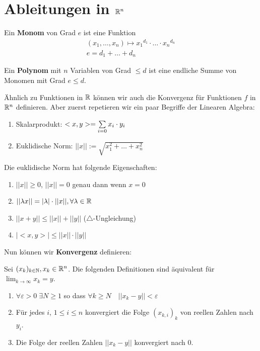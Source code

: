 \section{Ableitungen in $\mathbb{R}^n$}


Ein \textbf{Monom} von Grad $e$ ist eine Funktion
\begin{align*}
    (x_1, \dots, x_n) \mapsto {x_1}^{d_1} \cdot \ldots \cdot {x_n}^{d_n}\\
    e = d_1 + \ldots + d_n
\end{align*}

\begin{tcolorbox}
    Ein \textbf{Polynom} mit $n$ Variablen von Grad $\leq d$ ist eine endliche Summe von Monomen mit 
    Grad $e \leq d$.
\end{tcolorbox}



Ähnlich zu Funktionen in $\mathbb{R}$ können wir auch die Konvergenz für Funktionen $f$ in $\mathbb{R}^n$ definieren.
Aber zuerst repetieren wir ein paar Begriffe der Linearen Algebra:

\begin{enumerate}[label=(\arabic*)]
    \item Skalarprodukt: $<x,y> = \sum\limits_{i = 0} x_i \cdot y_i$
    \item Euklidische Norm: $||x|| := \sqrt{x_1^2 + \dots + x_n^2}$
\end{enumerate}

Die euklidische Norm hat folgende Eigenschaften:

\begin{enumerate}[label=(\arabic*)]
    \item $||x|| \geq 0$, $||x|| = 0$ genau dann wenn $x = 0$
    \item $||\lambda x|| = |\lambda| \cdot ||x||, \forall \lambda \in \mathbb{R}$
    \item $||x + y|| \leq ||x|| + ||y||$ ($\triangle$-Ungleichung)
    \item $|<x,y>| \leq ||x|| \cdot ||y||$
\end{enumerate}


\vfill\null
\columnbreak


Nun können wir \textbf{Konvergenz} definieren:
\begin{tcolorbox}
    Sei $(x_k)_{k \in \mathbb{N}}, x_k \in \mathbb{R}^n$. Die folgenden Definitionen sind äquivalent für $\lim_{k \to \infty} x_k = y$.

    \begin{enumerate}[label=(\arabic*)]
        \item $\forall \varepsilon > 0 \; \exists N \geq 1$ so dass $\forall k \geq N \quad ||x_k - y|| < \varepsilon$
        \item Für jedes $i$, $1 \leq i \leq n$ konvergiert die Folge $(x_{k, i})_k$ von reellen Zahlen nach $y_i$.
        \item Die Folge der reellen Zahlen $||x_k - y||$ konvergiert nach $0$.
    \end{enumerate}
\end{tcolorbox}

